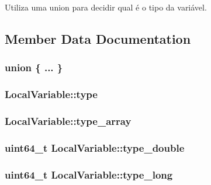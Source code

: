 Utiliza uma union para decidir qual é o tipo da variável. 

\subsection{Member Data Documentation}
\subsubsection[{\texorpdfstring{"@36}{@36}}]{\setlength{\rightskip}{0pt plus 5cm}union \{ ... \} }\hypertarget{structLocalVariable_a3570d34d2fed3081d2b7a21bb07cf290}{}\label{structLocalVariable_a3570d34d2fed3081d2b7a21bb07cf290}
\subsubsection[{\texorpdfstring{type}{type}}]{ Local\+Variable\+::type}\hypertarget{structLocalVariable_a05438f40d41a69cde0a4d50a37bf9420}{}\label{structLocalVariable_a05438f40d41a69cde0a4d50a37bf9420}
\subsubsection[{\texorpdfstring{type\+\_\+array}{type_array}}]{ Local\+Variable\+::type\+\_\+array}\hypertarget{structLocalVariable_a6905d4b07d1ff41deaa0189ae8761850}{}\label{structLocalVariable_a6905d4b07d1ff41deaa0189ae8761850}
\subsubsection[{\texorpdfstring{type\+\_\+double}{type_double}}]{\setlength{\rightskip}{0pt plus 5cm}uint64\+\_\+t Local\+Variable\+::type\+\_\+double}\hypertarget{structLocalVariable_a488dfde0ac92dbb3f2b4d56280771141}{}\label{structLocalVariable_a488dfde0ac92dbb3f2b4d56280771141}
\subsubsection[{\texorpdfstring{type\+\_\+long}{type_long}}]{\setlength{\rightskip}{0pt plus 5cm}uint64\+\_\+t Local\+Variable\+::type\+\_\+long}\hypertarget{structLocalVariable_af14e5709d8a7c9397571316821b9171b}{}\label{structLocalVariable_af14e5709d8a7c9397571316821b9171b}
